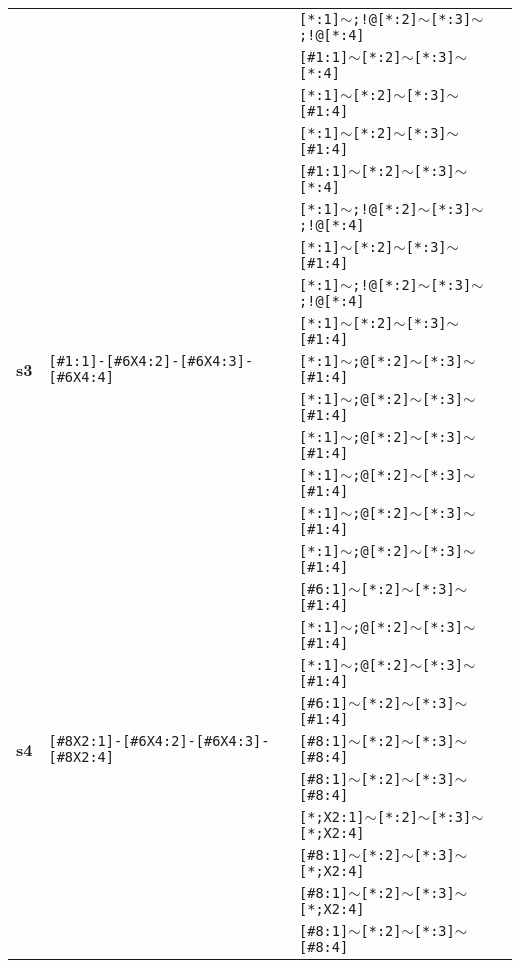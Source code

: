 \begin{longtable}{>{\baselineskip=10pt}p{} >{\baselineskip=10pt}p{} >{\baselineskip=10pt}p{}}
 &  & \texttt{[*:1]$\sim$;!@[*:2]$\sim$[*:3]$\sim$;!@[*:4]} \\ 
 &  & \texttt{[\#1:1]$\sim$[*:2]$\sim$[*:3]$\sim$[*:4]} \\ 
 &  & \texttt{[*:1]$\sim$[*:2]$\sim$[*:3]$\sim$[\#1:4]} \\ 
 &  & \texttt{[*:1]$\sim$[*:2]$\sim$[*:3]$\sim$[\#1:4]} \\ 
 &  & \texttt{[\#1:1]$\sim$[*:2]$\sim$[*:3]$\sim$[*:4]} \\ 
 &  & \texttt{[*:1]$\sim$;!@[*:2]$\sim$[*:3]$\sim$;!@[*:4]} \\ 
 &  & \texttt{[*:1]$\sim$[*:2]$\sim$[*:3]$\sim$[\#1:4]} \\ 
 &  & \texttt{[*:1]$\sim$;!@[*:2]$\sim$[*:3]$\sim$;!@[*:4]} \\ 
 &  & \texttt{[*:1]$\sim$[*:2]$\sim$[*:3]$\sim$[\#1:4]} \\ 
\hline 
\textbf{s3} & \texttt{[\#1:1]-[\#6X4:2]-[\#6X4:3]-[\#6X4:4]} & \texttt{[*:1]$\sim$;@[*:2]$\sim$[*:3]$\sim$[\#1:4]} \\ 
 &  & \texttt{[*:1]$\sim$;@[*:2]$\sim$[*:3]$\sim$[\#1:4]} \\ 
 &  & \texttt{[*:1]$\sim$;@[*:2]$\sim$[*:3]$\sim$[\#1:4]} \\ 
 &  & \texttt{[*:1]$\sim$;@[*:2]$\sim$[*:3]$\sim$[\#1:4]} \\ 
 &  & \texttt{[*:1]$\sim$;@[*:2]$\sim$[*:3]$\sim$[\#1:4]} \\ 
 &  & \texttt{[*:1]$\sim$;@[*:2]$\sim$[*:3]$\sim$[\#1:4]} \\ 
 &  & \texttt{[\#6:1]$\sim$[*:2]$\sim$[*:3]$\sim$[\#1:4]} \\ 
 &  & \texttt{[*:1]$\sim$;@[*:2]$\sim$[*:3]$\sim$[\#1:4]} \\ 
 &  & \texttt{[*:1]$\sim$;@[*:2]$\sim$[*:3]$\sim$[\#1:4]} \\ 
 &  & \texttt{[\#6:1]$\sim$[*:2]$\sim$[*:3]$\sim$[\#1:4]} \\ 
\hline 
\textbf{s4} & \texttt{[\#8X2:1]-[\#6X4:2]-[\#6X4:3]-[\#8X2:4]} & \texttt{[\#8:1]$\sim$[*:2]$\sim$[*:3]$\sim$[\#8:4]} \\ 
 &  & \texttt{[\#8:1]$\sim$[*:2]$\sim$[*:3]$\sim$[\#8:4]} \\ 
 &  & \texttt{[*;X2:1]$\sim$[*:2]$\sim$[*:3]$\sim$[*;X2:4]} \\ 
 &  & \texttt{[\#8:1]$\sim$[*:2]$\sim$[*:3]$\sim$[*;X2:4]} \\ 
 &  & \texttt{[\#8:1]$\sim$[*:2]$\sim$[*:3]$\sim$[*;X2:4]} \\ 
 &  & \texttt{[\#8:1]$\sim$[*:2]$\sim$[*:3]$\sim$[\#8:4]} \\ 

\end{longtable}

